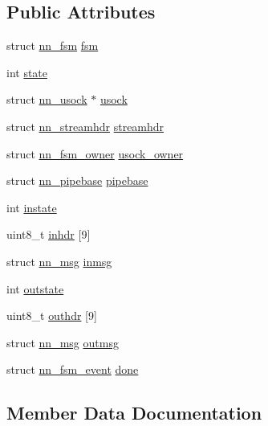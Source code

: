 \subsection*{Public Attributes}
\begin{DoxyCompactItemize}
\item 
struct \hyperlink{structnn__fsm}{nn\+\_\+fsm} \hyperlink{structnn__sipc_a87d9da9fa28a5657b0aa55fac311de02}{fsm}
\item 
int \hyperlink{structnn__sipc_aee023008a3ddf7b8a7b4bb4b3794dec2}{state}
\item 
struct \hyperlink{structnn__usock}{nn\+\_\+usock} $\ast$ \hyperlink{structnn__sipc_adc95a413352d2739ad66cb182ca34dbc}{usock}
\item 
struct \hyperlink{structnn__streamhdr}{nn\+\_\+streamhdr} \hyperlink{structnn__sipc_a8c72bf1257a05f914b59ce67e6b80a64}{streamhdr}
\item 
struct \hyperlink{structnn__fsm__owner}{nn\+\_\+fsm\+\_\+owner} \hyperlink{structnn__sipc_a5f5d602ecba8aabe32671874b2e40adb}{usock\+\_\+owner}
\item 
struct \hyperlink{structnn__pipebase}{nn\+\_\+pipebase} \hyperlink{structnn__sipc_ab5d0ceac7e850f4d12eff3a323e89824}{pipebase}
\item 
int \hyperlink{structnn__sipc_ac1145ec262ed3684d3d0f2625bcf699b}{instate}
\item 
uint8\+\_\+t \hyperlink{structnn__sipc_acc4edce715de1ec964ca6b1bbd7bd495}{inhdr} \mbox{[}9\mbox{]}
\item 
struct \hyperlink{structnn__msg}{nn\+\_\+msg} \hyperlink{structnn__sipc_a9d2c2aaae57d4b332a3c73db340b036d}{inmsg}
\item 
int \hyperlink{structnn__sipc_aa55363371878ff4b4782147f123face8}{outstate}
\item 
uint8\+\_\+t \hyperlink{structnn__sipc_a660705dddfd7289a6ca2de2090655157}{outhdr} \mbox{[}9\mbox{]}
\item 
struct \hyperlink{structnn__msg}{nn\+\_\+msg} \hyperlink{structnn__sipc_a6a129285cd3d0abc998c255433750151}{outmsg}
\item 
struct \hyperlink{structnn__fsm__event}{nn\+\_\+fsm\+\_\+event} \hyperlink{structnn__sipc_a1c0da8d5bfce0d9889f1c2329ec0df6e}{done}
\end{DoxyCompactItemize}


\subsection{Member Data Documentation}
